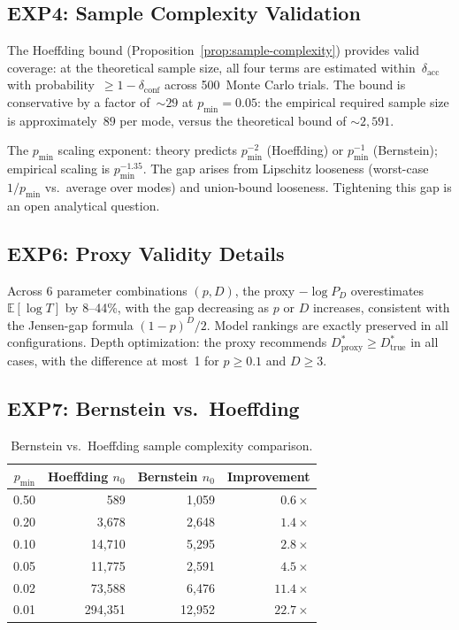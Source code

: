 \documentclass[twoside,11pt]{article}
\newcommand{\E}{\mathbb{E}}
\newcommand{\pmin}{p_{\min}}
\newcommand{\dacc}{\delta_{\mathrm{acc}}}
\newcommand{\dconf}{\delta_{\mathrm{conf}}}
\newcommand{\Dstar}{D^*}
\begin{document}
\subsection{EXP4: Sample Complexity Validation}

The Hoeffding bound (Proposition~\ref{prop:sample-complexity}) provides valid coverage: at the theoretical sample size, all four terms are estimated within~$\dacc$ with probability~$\ge 1 - \dconf$ across 500~Monte Carlo trials.
The bound is conservative by a factor of~$\sim 29$ at $\pmin = 0.05$: the empirical required sample size is approximately~$89$ per mode, versus the theoretical bound of $\sim 2{,}591$.

The $\pmin$ scaling exponent: theory predicts $\pmin^{-2}$ (Hoeffding) or $\pmin^{-1}$ (Bernstein); empirical scaling is $\pmin^{-1.35}$.
The gap arises from Lipschitz looseness (worst-case $1/\pmin$ vs.\ average over modes) and union-bound looseness.
Tightening this gap is an open analytical question.

\subsection{EXP6: Proxy Validity Details}

Across 6 parameter combinations $(p, D)$, the proxy $-\log P_D$ overestimates $\E[\log T]$ by 8--44\%, with the gap decreasing as $p$ or $D$ increases, consistent with the Jensen-gap formula $(1-p)^D/2$.
Model rankings are exactly preserved in all configurations.
Depth optimization: the proxy recommends $\Dstar_{\mathrm{proxy}} \ge \Dstar_{\mathrm{true}}$ in all cases, with the difference at most~1 for $p \ge 0.1$ and $D \ge 3$.

\subsection{EXP7: Bernstein vs.\ Hoeffding}

\begin{table}[h]
\centering
\caption{Bernstein vs.\ Hoeffding sample complexity comparison.}
\label{tab:bernstein}
\begin{tabular}{rrrr}
\toprule
$\pmin$ & Hoeffding $n_0$ & Bernstein $n_0$ & Improvement \\
\midrule
0.50 & 589 & 1{,}059 & $0.6\times$ \\
0.20 & 3{,}678 & 2{,}648 & $1.4\times$ \\
0.10 & 14{,}710 & 5{,}295 & $2.8\times$ \\
0.05 & 11{,}775 & 2{,}591 & $4.5\times$ \\
0.02 & 73{,}588 & 6{,}476 & $11.4\times$ \\
0.01 & 294{,}351 & 12{,}952 & $22.7\times$ \\
\bottomrule
\end{tabular}
\end{table}
\end{document}
